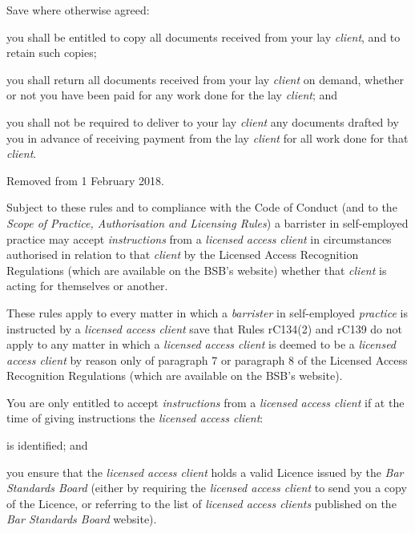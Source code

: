 Save where otherwise agreed:
\begin{numlist}\item you shall be entitled to copy all documents received from your lay
\emph{client}, and to retain such copies;
\item you shall return all documents received from your lay \emph{client}
on demand, whether or not you have been paid for any work done for the
lay \emph{client}; and
\item you shall not be required to deliver to your lay \emph{client} any
documents drafted by you in advance of receiving payment from the lay
\emph{client} for all work done for that \emph{client}.
\item Removed from 1 February 2018.
\end{numlist}



Subject to these rules and to compliance with the Code of Conduct (and
to the \emph{Scope of Practice, Authorisation and Licensing Rules}) a
barrister in self-employed practice may accept \emph{instructions} from
a \emph{licensed access client} in circumstances authorised in relation
to that \emph{client} by the Licensed Access Recognition Regulations
(which are available on the BSB's website) whether that \emph{client} is
acting for themselves or another.


These rules apply to every matter in which a \emph{barrister} in
self-employed \emph{practice} is instructed by a \emph{licensed access
client} save that Rules rC134(2) and rC139 do not apply to any matter in
which a \emph{licensed access client} is deemed to be a \emph{licensed
access client} by reason only of paragraph 7 or paragraph 8 of the
Licensed Access Recognition Regulations (which are available on the
BSB's website).


You are only entitled to accept \emph{instructions} from a
\emph{licensed access client} if at the time of giving instructions the
\emph{licensed access client}:
\begin{numlist}\item is identified; and
\item you ensure that the \emph{licensed access client} holds a valid
Licence issued by the \emph{Bar Standards Board} (either by requiring
the \emph{licensed access client} to send you a copy of the Licence, or
referring to the list of \emph{licensed access clients} published on the
\emph{Bar Standards Board} website).
\end{numlist}

